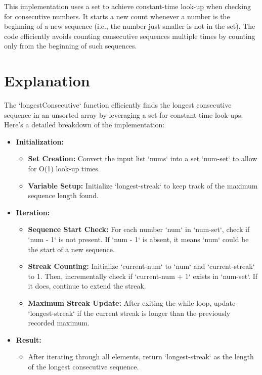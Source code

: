 This implementation uses a set to achieve constant-time look-up when checking for consecutive numbers. It starts a new count whenever a number is the beginning of a new sequence (i.e., the number just smaller is not in the set). The code efficiently avoids counting consecutive sequences multiple times by counting only from the beginning of such sequences.

\section*{Explanation}
The `longestConsecutive` function efficiently finds the longest consecutive sequence in an unsorted array by leveraging a set for constant-time look-ups. Here's a detailed breakdown of the implementation:

\begin{itemize}
	\item \textbf{Initialization:}
	\begin{itemize}
		\item \textbf{Set Creation:} Convert the input list `nums` into a set `num-set` to allow for O(1) look-up times.
		\item \textbf{Variable Setup:} Initialize `longest-streak` to keep track of the maximum sequence length found.
	\end{itemize}
	
	\item \textbf{Iteration:}
	\begin{itemize}
		\item \textbf{Sequence Start Check:} For each number `num` in `num-set`, check if `num - 1` is not present. If `num - 1` is absent, it means `num` could be the start of a new sequence.
		\item \textbf{Streak Counting:} Initialize `current-num` to `num` and `current-streak` to 1. Then, incrementally check if `current-num + 1` exists in `num-set`. If it does, continue to extend the streak.
		\item \textbf{Maximum Streak Update:} After exiting the while loop, update `longest-streak` if the current streak is longer than the previously recorded maximum.
	\end{itemize}
	
	\item \textbf{Result:}
	\begin{itemize}
		\item After iterating through all elements, return `longest-streak` as the length of the longest consecutive sequence.
	\end{itemize}
\end{itemize}

